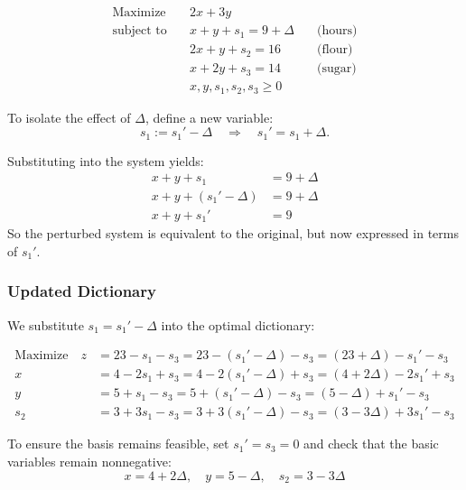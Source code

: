\begin{tcolorbox}[colback=gray!5!white, colframe=pink!75!black,    
    width=0.9\textwidth,
    box align=center, 
    title=\textbf{Perturbed Standard Form (RHS of Constraint 1)}]
\[
\begin{aligned}
\text{Maximize} \quad & 2x + 3y \\
\text{subject to} \quad 
& x + y + s_1 = 9 + \Delta \quad & \text{(hours)} \\
& 2x + y + s_2 = 16 \quad & \text{(flour)} \\
& x + 2y + s_3 = 14 \quad & \text{(sugar)} \\
& x, y, s_1, s_2, s_3 \geq 0
\end{aligned}
\]

To isolate the effect of \( \Delta \), define a new variable:
\[
s_1 := s_1' - \Delta \quad \Rightarrow \quad s_1' = s_1 + \Delta.
\]

Substituting into the system yields:
\[
\begin{aligned}
x + y + s_1 &= 9 + \Delta \\
x + y + (s_1' - \Delta) &= 9 + \Delta \\
x + y + s_1' &= 9
\end{aligned}
\]
So the perturbed system is equivalent to the original, but now expressed in terms of \( s_1' \).
\end{tcolorbox}

\subsubsection*{Updated Dictionary}

We substitute \( s_1 = s_1' - \Delta \) into the optimal dictionary:

\[
\begin{aligned}
\text{Maximize} \quad 
z &= 23 - s_1 - s_3 = 23 - (s_1' - \Delta) - s_3 = (23 + \Delta) - s_1' - s_3 \\
x &= 4 - 2s_1 + s_3 = 4 - 2(s_1' - \Delta) + s_3 = (4 + 2\Delta) - 2s_1' + s_3 \\
y &= 5 + s_1 - s_3 = 5 + (s_1' - \Delta) - s_3 = (5 - \Delta) + s_1' - s_3 \\
s_2 &= 3 + 3s_1 - s_3 = 3 + 3(s_1' - \Delta) - s_3 = (3 - 3\Delta) + 3s_1' - s_3
\end{aligned}
\]

To ensure the basis remains feasible, set \( s_1' = s_3 = 0 \) and check that the basic variables remain nonnegative:
\[
x = 4 + 2\Delta, \quad
y = 5 - \Delta, \quad
s_2 = 3 - 3\Delta
\]

